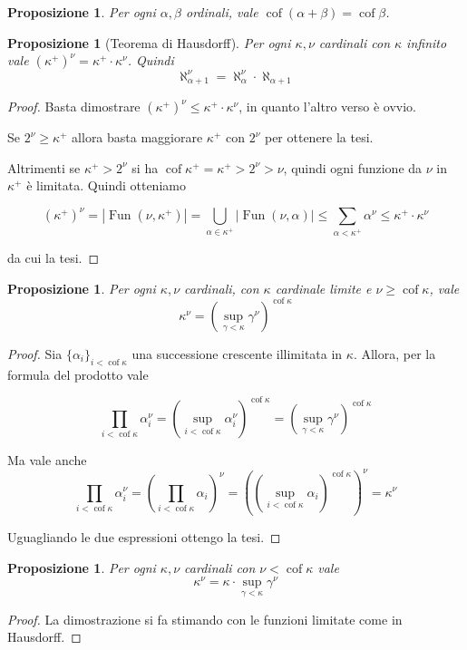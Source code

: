 \documentclass[a4paper,10pt,oneside]{article}
\DeclareMathOperator{\cof}{cof}
\DeclareMathOperator{\Fun}{Fun}
\newcommand{\abs}[1]{\left|#1\right|}
\theoremstyle{plain}
\newtheorem{myprop}[mytheorem]{Proposizione}
\theoremstyle{definition}
\theoremstyle{remark}
\begin{document}
\begin{myprop}
 Per ogni $\alpha, \beta$ ordinali, vale $\cof(\alpha+\beta) = \cof \beta$.
\end{myprop}

\begin{myprop}[Teorema di Hausdorff]
 Per ogni $\kappa,\nu$ cardinali con $\kappa$ infinito vale ${\left(\kappa^+\right)}^\nu=\kappa^+\cdot \kappa^\nu$. Quindi
 \[\aleph_{\alpha+1}^\nu=\aleph_{\alpha}^\nu\cdot \aleph_{\alpha+1}\]
\end{myprop}
\begin{proof}
 Basta dimostrare ${\left(\kappa^+\right)}^\nu \le\kappa^+\cdot \kappa^\nu$, in quanto l'altro verso è ovvio. 
 
 Se $2^\nu \ge \kappa^+$ allora basta maggiorare $\kappa^+$ con $2^\nu$ per ottenere la tesi.
 
 Altrimenti se $\kappa^+>2^\nu$ si ha $ \cof\kappa^+ =\kappa^+>2^\nu>\nu $, quindi ogni funzione da $\nu$ in $\kappa^+$ è limitata. Quindi otteniamo
 
 \[{\left(\kappa^+\right)}^\nu = \abs{\Fun(\nu,\kappa^+)} = \bigcup_{\alpha\in \kappa^+} \abs{\Fun(\nu,\alpha)} \le \sum_{\alpha<\kappa^+} \alpha^\nu \le \kappa^+\cdot \kappa^\nu\]
 
 da cui la tesi.
\end{proof}

\begin{myprop}
 Per ogni $\kappa,\nu$ cardinali, con $\kappa$ cardinale limite e $\nu \ge \cof \kappa$, vale \[\kappa^\nu={\left(\sup_{\gamma<\kappa}\gamma^\nu\right)}^{\cof\kappa}\]
\end{myprop}

\begin{proof}
 Sia $\{\alpha_i\}_{i<\cof\kappa}$ una successione crescente illimitata in $\kappa$. Allora, per la formula del prodotto vale
 
 \[\prod_{i<\cof\kappa} \alpha_i^\nu = \left(\sup_{i<\cof\kappa}\alpha_i^\nu\right)^{\cof\kappa}={\left(\sup_{\gamma<\kappa}\gamma^\nu\right)}^{\cof\kappa}\]
 
 Ma vale anche 
 \[\prod_{i<\cof\kappa} \alpha_i^\nu=\left(\prod_{i<\cof\kappa} \alpha_i\right)^\nu=\left(\left(\sup_{i<\cof\kappa}\alpha_i\right)^{\cof\kappa}\right)^\nu=\kappa^\nu\]
 
 Uguagliando le due espressioni ottengo la tesi.
\end{proof}

\begin{myprop}
 Per ogni $\kappa,\nu$ cardinali con $\nu < \cof \kappa$ vale \[\kappa^\nu=\kappa \cdot \sup_{\gamma<\kappa}\gamma^\nu\]
\end{myprop}
\begin{proof} La dimostrazione si fa stimando con le funzioni limitate come in Hausdorff.
 
\end{proof}
\end{document}
